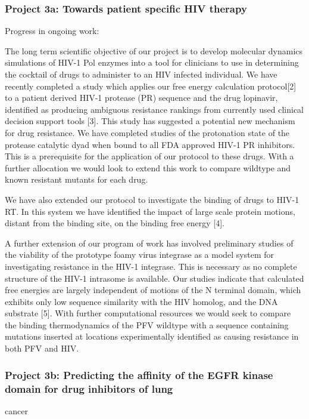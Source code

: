 \documentclass[a4paper,10pt]{article}
\begin{document}
\subsubsection{Project 3a: Towards patient specific HIV therapy}

Progress in ongoing work:

The long term scientific objective of our project is to develop molecular dynamics simulations of HIV-1 Pol enzymes into a tool for clinicians to use in determining the cocktail of drugs to administer to an HIV infected individual. We have recently completed a study which applies our free energy calculation protocol[2] to a patient derived HIV-1 protease (PR) sequence and the drug lopinavir, identified as producing ambiguous resistance rankings from currently used clinical decision support tools [3]. This study has suggested a potential new mechanism for drug resistance. We have completed studies of the protonation state of the protease catalytic dyad when bound to all FDA approved HIV-1 PR inhibitors. This is a prerequisite for the application of our protocol to these drugs. With a further allocation we would look to extend this work to compare wildtype and known resistant mutants for each drug.

We have also extended our protocol to investigate the binding of drugs to HIV-1 RT. In this system we have identified the impact of large scale protein motions, distant from the binding site, on the binding free energy [4].

A further extension of our program of work has involved preliminary studies of the viability of the prototype foamy virus integrase as a model system for investigating resistance in the HIV-1 integrase. This is necessary as no complete structure of the HIV-1 intrasome is available. Our studies indicate that calculated free energies are largely independent of motions of the N terminal domain, which exhibits only low sequence similarity with the HIV homolog, and the DNA substrate [5]. With further computational resources we would seek to compare the binding thermodynamics of the PFV wildtype with a sequence containing mutations inserted at locations experimentally identified as causing resistance in both PFV and HIV.

\subsubsection{Project 3b: Predicting the affinity of the EGFR kinase domain for drug inhibitors of lung}
cancer
\end{document}
